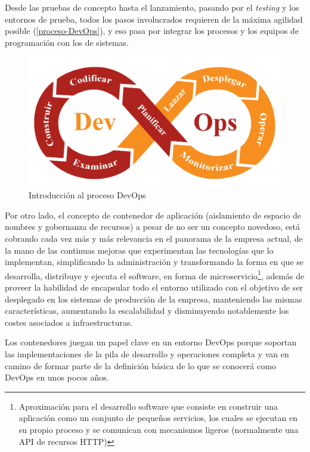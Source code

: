 Desde las pruebas de concepto hasta el lanzamiento, pasando por el \textit{testing} y los entornos de prueba, todos los pasos involucrados requieren de la máxima agilidad posible (\autoref{proceso-DevOps}), y eso pasa por integrar los procesos y los equipos de programación con los de sistemas\cite{claranet2017}.

\begin{figure}[htbp]
	\centering
	\includegraphics[width=0.80\linewidth]
	{introduccion/figuras/proceso-devops.png}
	\caption{Introducción al proceso DevOps}
	\label{proceso-DevOps}
\end{figure}

Por otro lado, el concepto de contenedor de aplicación (aislamiento de espacio de nombres y gobernanza de recursos) a pesar de no ser un concepto novedoso, está cobrando cada vez más y más relevancia en el panorama de la empresa actual, de la mano de las continuas mejoras que experimentan las tecnologías que lo implementan, simplificando la administración y transformando la forma en que se desarrolla, distribuye y ejecuta el software, en forma de microservicio\footnote{Aproximación para el desarrollo software que consiste en construir una aplicación como un conjunto de pequeños servicios, los cuales se ejecutan en su propio proceso y se comunican con mecanismos ligeros (normalmente una API de recursos HTTP)}, además de proveer la habilidad de encapsular todo el entorno utilizado con el objetivo de ser desplegado en los sistemas de producción de la empresa, manteniendo las mismas características, aumentando la escalabilidad y disminuyendo notablemente los costes asociados a infraestructuras.

Los contenedores juegan un papel clave en un entorno \gls{DevOps} porque soportan las implementaciones de la pila de desarrollo y operaciones completa y van en camino de formar parte de la definición básica de lo que se conocerá como \gls{DevOps} en unos pocos años\cite{searchdatacenter2015}.

